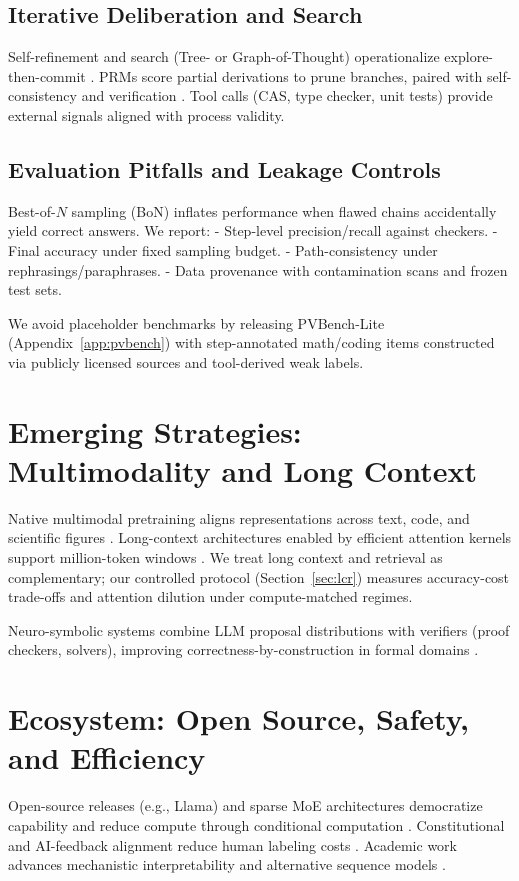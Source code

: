 \documentclass{article}
\begin{document}
\subsection{Iterative Deliberation and Search}
Self-refinement and search (Tree- or Graph-of-Thought) operationalize explore-then-commit \cite{wei2022chain, yao2023treeofthought, besta2023graphofthought}. PRMs score partial derivations to prune branches, paired with self-consistency and verification \cite{wang2023selfconsistency}. Tool calls (CAS, type checker, unit tests) provide external signals aligned with process validity.

\subsection{Evaluation Pitfalls and Leakage Controls}
Best-of-$N$ sampling (BoN) inflates performance when flawed chains accidentally yield correct answers. We report:
- Step-level precision/recall against checkers.
- Final accuracy under fixed sampling budget.
- Path-consistency under rephrasings/paraphrases.
- Data provenance with contamination scans and frozen test sets.

We avoid placeholder benchmarks by releasing PVBench-Lite (Appendix~\ref{app:pvbench}) with step-annotated math/coding items constructed via publicly licensed sources and tool-derived weak labels.

\section{Emerging Strategies: Multimodality and Long Context}
Native multimodal pretraining aligns representations across text, code, and scientific figures \cite{deepmind2023gemini1}. Long-context architectures enabled by efficient attention kernels support million-token windows \cite{dao2022flashattention, liu2023ring}. We treat long context and retrieval as complementary; our controlled protocol (Section~\ref{sec:lcr}) measures accuracy-cost trade-offs and attention dilution under compute-matched regimes.

Neuro-symbolic systems combine LLM proposal distributions with verifiers (proof checkers, solvers), improving correctness-by-construction in formal domains \cite{polu2023formal, trinh2024solving}.

\section{Ecosystem: Open Source, Safety, and Efficiency}
Open-source releases (e.g., Llama) and sparse MoE architectures democratize capability and reduce compute through conditional computation \cite{touvron2023llama, jiang2024mixtral, shazeer2017outrageously}. Constitutional and AI-feedback alignment reduce human labeling costs \cite{bai2022constitutional}. Academic work advances mechanistic interpretability and alternative sequence models \cite{olah2020zoom, gu2023mamba}.
\end{document}
